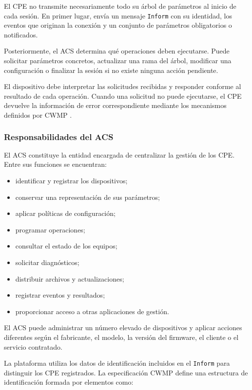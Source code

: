 El CPE no transmite necesariamente todo su árbol de parámetros al inicio
de cada sesión. En primer lugar, envía un mensaje
\texttt{Inform} con su identidad, los eventos que originan la conexión y
un conjunto de parámetros obligatorios o notificados.

Posteriormente, el ACS determina qué operaciones deben ejecutarse. Puede
solicitar parámetros concretos, actualizar una rama del árbol, modificar
una configuración o finalizar la sesión si no existe ninguna acción
pendiente.

El dispositivo debe interpretar las solicitudes recibidas y responder
conforme al resultado de cada operación. Cuando una solicitud no puede
ejecutarse, el CPE devuelve la información de error correspondiente
mediante los mecanismos definidos por CWMP \cite{bbf_tr069}.


\subsubsection*{Responsabilidades del ACS}

El ACS constituye la entidad encargada de centralizar la gestión de los
CPE. Entre sus funciones se encuentran:

\begin{itemize}
    \item identificar y registrar los dispositivos;
    \item conservar una representación de sus parámetros;
    \item aplicar políticas de configuración;
    \item programar operaciones;
    \item consultar el estado de los equipos;
    \item solicitar diagnósticos;
    \item distribuir archivos y actualizaciones;
    \item registrar eventos y resultados;
    \item proporcionar acceso a otras aplicaciones de gestión.
\end{itemize}

El ACS puede administrar un número elevado de dispositivos y aplicar
acciones diferentes según el fabricante, el modelo, la versión del
firmware, el cliente o el servicio contratado.

La plataforma utiliza los datos de identificación incluidos en el
\texttt{Inform} para distinguir los CPE registrados. La especificación
CWMP define una estructura de identificación formada por elementos como:

